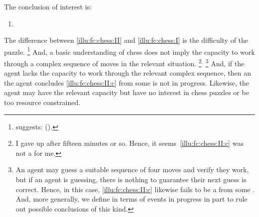 \begin{note}[Chess II]
  \noindent%
  The conclusion of interest is:
  \begin{enumerate}[label=C\thescenarioCounter., ref=C\thescenarioCounter]
  \item
    \label{illu:fc:chess:II:c}
  \end{enumerate}
  The difference between \autoref{illu:fc:chess:II} and \autoref{illu:fc:chess:I} is the difficulty of the puzzle.%
  \footnote{
    \citeauthor{Emms:2000aa} suggests:
    (\citeyear[46]{Emms:2000aa}).
  }
  And, a basic understanding of chess does not imply the capacity to work through a complex sequence of moves in the relevant situation.%
  \footnote{
    I gave up after fifteen minutes or so.
    Hence, it seems~\ref{illu:fc:chess:II:c} was not a \fc{} for me.
  }\(^{,}\)%
  \footnote{
    An agent may guess a suitable sequence of four moves and verify they work, but if an agent is guessing, there is nothing to guarantee their next guess is correct.
    Hence, in this case, \ref{illu:fc:chess:II:c} likewise fails to be a \fc{} from some \pool{}.
    And, more generally, we define  in terms of events in progress in part to rule out possible conclusions of this kind.
  }
  And, if the agent lacks the capacity to work through the relevant complex sequence, then an  the agent concludes \ref{illu:fc:chess:II:c} from some \pool{} is not in progress.
  Likewise, the agent may have the relevant capacity but have no interest in chess puzzles or be too resource constrained.
\end{note}


